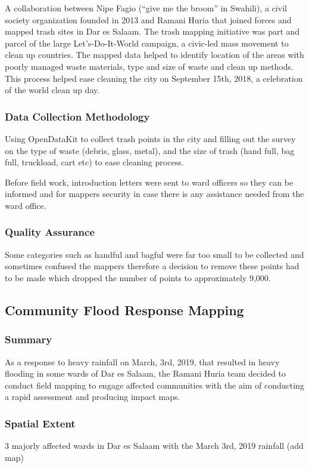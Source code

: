 \documentclass[a4paper,12pt,twoside]{article}
\begin{document}
A collaboration between Nipe Fagio (“give me the broom” in Swahili), a civil society organization founded in 2013 and Ramani Huria that joined forces and mapped trash sites in Dar es Salaam. The trash mapping initiative was part and parcel of the large Let’s-Do-It-World campaign, a civic-led mass movement to clean up countries.
The mapped data helped to identify location of the areas with poorly managed waste materials, type and size of waste and clean up methods. This process helped ease cleaning the city on September 15th, 2018, a celebration of the world clean up day.

\subsubsection{Data Collection Methodology}
Using OpenDataKit to collect trash points in the city and filling out the survey on the type of waste (debris, glass, metal), and the size of trash (hand full, bag full, truckload, cart etc) to ease cleaning process.

Before field work, introduction letters were sent to ward officers so they can be informed and for mappers security in case there is any assistance needed from the ward office.

\subsubsection{Quality Assurance}
Some categories such as handful and bagful were far too small to be collected and sometimes confused the mappers therefore a decision to remove these points had to be made which dropped the number of points to approximately 9,000.

\newpage
\subsection{Community Flood Response Mapping}
\subsubsection{Summary}
As a response to heavy rainfall on March, 3rd, 2019, that resulted in heavy flooding in some wards of Dar es Salaam, the Ramani Huria team decided to conduct field mapping to engage affected communities with the aim of conducting a rapid assessment and producing impact maps.
\subsubsection{Spatial Extent}
3 majorly affected wards in Dar es Salaam with the March 3rd, 2019 rainfall (add map)
\end{document}
